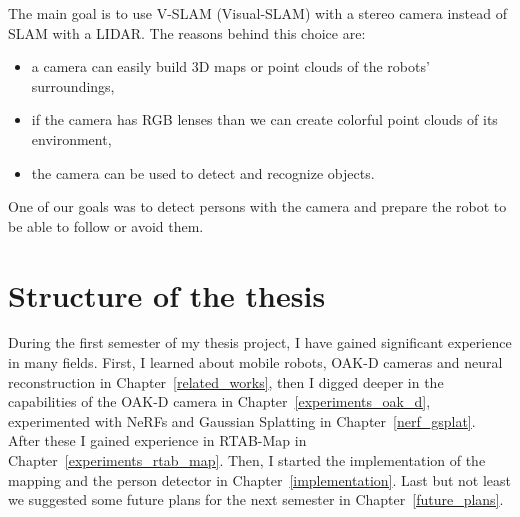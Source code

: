 The main goal is to use V-SLAM (Visual-SLAM) with a stereo camera instead of SLAM with a LIDAR. The reasons behind this choice are:
\begin{itemize}
    \item a camera can easily build 3D maps or point clouds of the robots' surroundings,
    \item if the camera has RGB lenses than we can create colorful point clouds of its environment,
    \item the camera can be used to detect and recognize objects.
\end{itemize}
One of our goals was to detect persons with the camera and prepare the robot to be able to follow or avoid them.

\section{Structure of the thesis}

During the first semester of my thesis project, I have gained significant experience in many fields. First, I learned about mobile robots, OAK-D cameras and neural reconstruction in Chapter~\ref{related_works}, then I digged deeper in the capabilities of the OAK-D camera in Chapter~\ref{experiments_oak_d}, experimented with NeRFs and Gaussian Splatting in Chapter~\ref{nerf_gsplat}. After these I gained experience in RTAB-Map in Chapter~\ref{experiments_rtab_map}. Then, I started the implementation of the mapping and the person detector in Chapter~\ref{implementation}. Last but not least we suggested some future plans for the next semester in Chapter~\ref{future_plans}.

